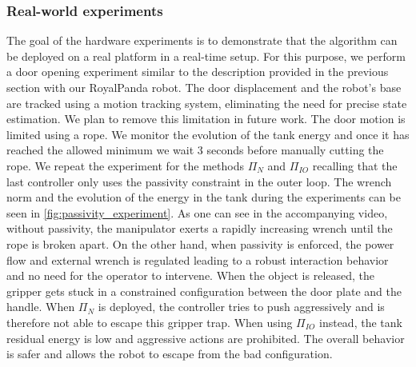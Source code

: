 \vspace{0.3cm}
\subsubsection{Real-world experiments}
The goal of the hardware experiments is to demonstrate that the algorithm can be deployed on a real platform in a real-time setup. For this purpose, we perform a door opening experiment similar to the description provided in the previous section with our RoyalPanda robot. The door displacement and the robot's base are tracked using a motion tracking system, eliminating the need for precise state estimation. We plan to remove this limitation in future work. The door motion is limited using a rope. We monitor the evolution of the tank energy and once it has reached the allowed minimum we wait 3 seconds before manually cutting the rope. We repeat the experiment for the methods $\Pi_{N}$ and $\Pi_{IO}$ recalling that the last controller only uses the passivity constraint in the outer loop. The wrench norm and the evolution of the energy in the tank during the experiments can be seen in \fig \ref{fig:passivity_experiment}. As one can see in the accompanying video, without passivity, the manipulator exerts a rapidly increasing wrench until the rope is broken apart. On the other hand, when passivity is enforced, the power flow and external wrench is regulated leading to a robust interaction behavior and no need for the operator to intervene. When the object is released, the gripper gets stuck in a constrained configuration between the door plate and the handle. When $\Pi_{N}$ is deployed, the controller tries to push aggressively and is therefore not able to escape this gripper trap. When using $\Pi_{IO}$ instead, the tank residual energy is low and aggressive actions are prohibited. The overall behavior is safer and allows the robot to escape from the bad configuration.  

